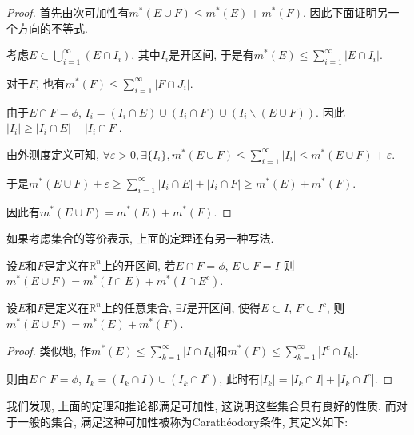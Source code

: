 \documentclass[theorem=false,mathfont=none,openany,sub3section]{easybook}
\begin{document}
\begin{proof}
  首先由次可加性有$m^{*}(E\cup F)\leqslant m^{*}(E)+m^{*}(F)$. 因此下面证明另一个方向的不等式.\par
  考虑$E\subset \bigcup_{i=1}^{\infty}(E\cap I_i)$, 其中$I_i$是开区间, 于是有$m^{*}(E)\leqslant \sum_{i=1}^{\infty}|E\cap I_i|$.\par
  对于$F$, 也有$m^{*}(F)\leqslant \sum_{i=1}^{\infty}|F\cap J_i|$.\par
  由于$E\cap F = \phi$, $I_i=(I_i\cap E)\cup (I_i\cap F)\cup (I_i\backslash (E\cup F))$. 因此$|I_i|\geqslant |I_i\cap E|+|I_i\cap F|$.\par
  由外测度定义可知, $\forall \varepsilon >0, \exists \{I_i\}, m^{*}(E\cup F)\leqslant \sum_{i=1}^{\infty}|I_i|\leqslant m^{*}(E\cup F)+\varepsilon$.\par
  于是$m^{*}(E\cup F)+\varepsilon \geqslant \sum_{i=1}^{\infty}|I_i\cap E|+|I_i\cap F|\geqslant m^{*}(E)+m^{*}(F)$.\par
  因此有$m^{*}(E\cup F)= m^{*}(E)+m^{*}(F)$.\par
\end{proof}

\begin{remark}
  如果考虑集合的等价表示, 上面的定理还有另一种写法.\par
\end{remark}

\begin{corollary}
  设$E$和$F$是定义在$\mathbb{R}^n$上的开区间, 若$E\cap F = \phi$, $E\cup F=I$ 则$m^{*}(E\cup F)= m^{*}(I\cap E)+m^{*}(I\cap E^c)$.\par
\end{corollary}

\begin{corollary}
  设$E$和$F$是定义在$\mathbb{R}^n$上的任意集合, $\exists I$是开区间, 使得$E\subset I$, $F\subset I^c$, 则$m^{*}(E\cup F)= m^{*}(E)+m^{*}(F)$.\par
\end{corollary}

\begin{proof}
  类似地, 作$m^{*}(E)\leqslant \sum_{k=1}^{\infty}|I\cap I_k|$和$m^{*}(F)\leqslant \sum_{k=1}^{\infty}|I^c\cap I_k|$.\par
  则由$E\cap F=\phi$, $I_k=(I_k\cap I)\cup (I_k\cap I^c)$, 此时有$|I_k|=|I_k\cap I|+|I_k\cap I^c|$.\par
\end{proof}

我们发现, 上面的定理和推论都满足可加性, 这说明这些集合具有良好的性质. 而对于一般的集合, 满足这种可加性被称为Carathéodory条件, 其定义如下:\par
\end{document}

